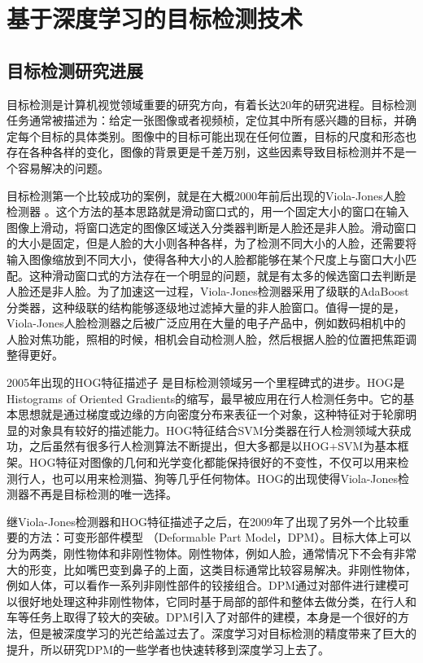\chapter{基于深度学习的目标检测技术}
\label{chap:2}

\section{目标检测研究进展}
目标检测是计算机视觉领域重要的研究方向，有着长达20年的研究进程。目标检测任务通常被描述为：给定一张图像或者视频桢，定位其中所有感兴趣的目标，并确定每个目标的具体类别。图像中的目标可能出现在任何位置，目标的尺度和形态也存在各种各样的变化，图像的背景更是千差万别，这些因素导致目标检测并不是一个容易解决的问题。

目标检测第一个比较成功的案例，就是在大概2000年前后出现的Viola-Jones人脸检测器 \cite{viola-jones} \cite{via-jones-face}。这个方法的基本思路就是滑动窗口式的，用一个固定大小的窗口在输入图像上滑动，将窗口选定的图像区域送入分类器判断是人脸还是非人脸。滑动窗口的大小是固定，但是人脸的大小则各种各样，为了检测不同大小的人脸，还需要将输入图像缩放到不同大小，使得各种大小的人脸都能够在某个尺度上与窗口大小匹配。这种滑动窗口式的方法存在一个明显的问题，就是有太多的候选窗口去判断是人脸还是非人脸。为了加速这一过程，Viola-Jones检测器采用了级联的AdaBoost分类器，这种级联的结构能够逐级地过滤掉大量的非人脸窗口。值得一提的是，Viola-Jones人脸检测器之后被广泛应用在大量的电子产品中，例如数码相机中的人脸对焦功能，照相的时候，相机会自动检测人脸，然后根据人脸的位置把焦距调整得更好。

2005年出现的HOG特征描述子 \cite{hog} 是目标检测领域另一个里程碑式的进步。HOG是Histograms of Oriented Gradients的缩写，最早被应用在行人检测任务中。它的基本思想就是通过梯度或边缘的方向密度分布来表征一个对象，这种特征对于轮廓明显的对象具有较好的描述能力。HOG特征结合SVM分类器在行人检测领域大获成功，之后虽然有很多行人检测算法不断提出，但大多都是以HOG+SVM为基本框架。HOG特征对图像的几何和光学变化都能保持很好的不变性，不仅可以用来检测行人，也可以用来检测猫、狗等几乎任何物体。HOG的出现使得Viola-Jones检测器不再是目标检测的唯一选择。

继Viola-Jones检测器和HOG特征描述子之后，在2009年了出现了另外一个比较重要的方法：可变形部件模型 （Deformable Part Model，DPM）\cite{dpm}。目标大体上可以分为两类，刚性物体和非刚性物体。刚性物体，例如人脸，通常情况下不会有非常大的形变，比如嘴巴变到鼻子的上面，这类目标通常比较容易解决。非刚性物体，例如人体，可以看作一系列非刚性部件的铰接组合。DPM通过对部件进行建模可以很好地处理这种非刚性物体，它同时基于局部的部件和整体去做分类，在行人和车等任务上取得了较大的突破。DPM引入了对部件的建模，本身是一个很好的方法，但是被深度学习的光芒给盖过去了。深度学习对目标检测的精度带来了巨大的提升，所以研究DPM的一些学者也快速转移到深度学习上去了。

